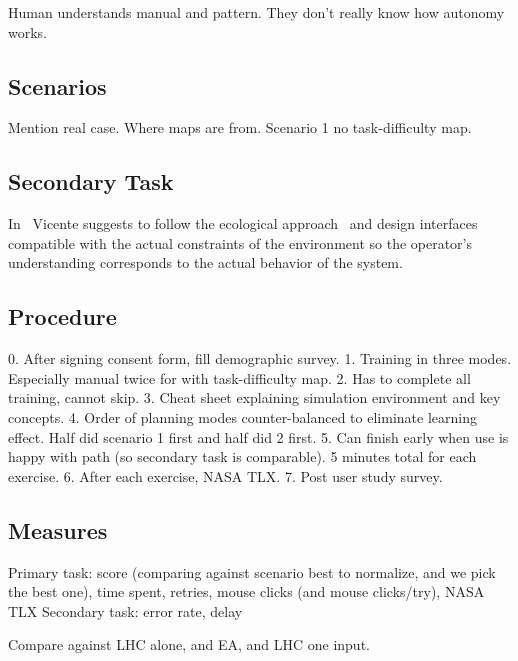 \documentclass[journal]{IEEEtran}
\begin{document}
Human understands manual and pattern.
They don't really know how autonomy works.


\subsection{Scenarios}

Mention real case. Where maps are from.
Scenario 1 no task-difficulty map.

\subsection{Secondary Task}

In~\cite{Vicente1997Should} Vicente suggests to follow the ecological approach~\cite{Rasmussen1994Cognitive} and design interfaces compatible with the actual constraints of the environment so the operator's understanding corresponds to the actual behavior of the system. 


\subsection{Procedure}

0. After signing consent form, fill demographic survey.
1. Training in three modes. Especially manual twice for with task-difficulty map.
2. Has to complete all training, cannot skip.
3. Cheat sheet explaining simulation environment and key concepts.
4. Order of planning modes counter-balanced to eliminate learning effect. Half did scenario 1 first and half did 2 first.
5. Can finish early when use is happy with path (so secondary task is comparable). 5 minutes total for each exercise.
6. After each exercise, NASA TLX.
7. Post user study survey. 

\subsection{Measures}

Primary task: score (comparing against scenario best to normalize, and we pick the best one), time spent, retries, mouse clicks (and mouse clicks/try), NASA TLX
Secondary task: error rate, delay

Compare against LHC alone, and EA, and LHC one input.

\end{document}
